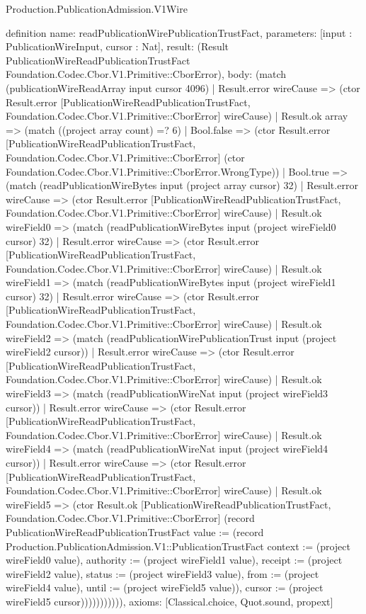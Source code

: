 \begin{lexlean}{Production.PublicationAdmission.V1Wire}
\begin{semanticmodule}
definition{
  name: readPublicationWirePublicationTrustFact,
  parameters: [input : PublicationWireInput, cursor : Nat],
  result: (Result PublicationWireReadPublicationTrustFact Foundation.Codec.Cbor.V1.Primitive::CborError),
  body: (match (publicationWireReadArray input cursor 4096)
    | Result.error wireCause => (ctor Result.error [PublicationWireReadPublicationTrustFact, Foundation.Codec.Cbor.V1.Primitive::CborError] wireCause)
    | Result.ok array => (match ((project array count) =? 6)
      | Bool.false => (ctor Result.error [PublicationWireReadPublicationTrustFact, Foundation.Codec.Cbor.V1.Primitive::CborError] (ctor Foundation.Codec.Cbor.V1.Primitive::CborError.WrongType))
      | Bool.true => (match (readPublicationWireBytes input (project array cursor) 32)
        | Result.error wireCause => (ctor Result.error [PublicationWireReadPublicationTrustFact, Foundation.Codec.Cbor.V1.Primitive::CborError] wireCause)
        | Result.ok wireField0 => (match (readPublicationWireBytes input (project wireField0 cursor) 32)
          | Result.error wireCause => (ctor Result.error [PublicationWireReadPublicationTrustFact, Foundation.Codec.Cbor.V1.Primitive::CborError] wireCause)
          | Result.ok wireField1 => (match (readPublicationWireBytes input (project wireField1 cursor) 32)
            | Result.error wireCause => (ctor Result.error [PublicationWireReadPublicationTrustFact, Foundation.Codec.Cbor.V1.Primitive::CborError] wireCause)
            | Result.ok wireField2 => (match (readPublicationWirePublicationTrust input (project wireField2 cursor))
              | Result.error wireCause => (ctor Result.error [PublicationWireReadPublicationTrustFact, Foundation.Codec.Cbor.V1.Primitive::CborError] wireCause)
              | Result.ok wireField3 => (match (readPublicationWireNat input (project wireField3 cursor))
                | Result.error wireCause => (ctor Result.error [PublicationWireReadPublicationTrustFact, Foundation.Codec.Cbor.V1.Primitive::CborError] wireCause)
                | Result.ok wireField4 => (match (readPublicationWireNat input (project wireField4 cursor))
                  | Result.error wireCause => (ctor Result.error [PublicationWireReadPublicationTrustFact, Foundation.Codec.Cbor.V1.Primitive::CborError] wireCause)
                  | Result.ok wireField5 => (ctor Result.ok [PublicationWireReadPublicationTrustFact, Foundation.Codec.Cbor.V1.Primitive::CborError] (record PublicationWireReadPublicationTrustFact {value := (record Production.PublicationAdmission.V1::PublicationTrustFact {context := (project wireField0 value), authority := (project wireField1 value), receipt := (project wireField2 value), status := (project wireField3 value), from := (project wireField4 value), until := (project wireField5 value)}), cursor := (project wireField5 cursor)})))))))))),
  axioms: [Classical.choice, Quot.sound, propext]
}


\end{semanticmodule}
\end{lexlean}
